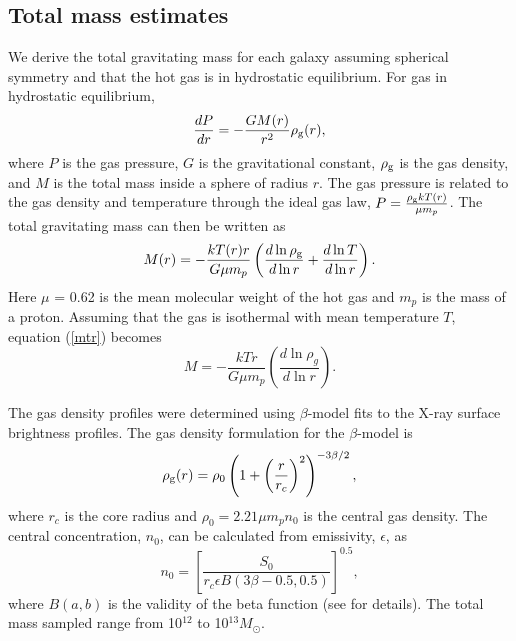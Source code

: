 \documentclass[iop]{emulateapj}
\begin{document}
\subsection{Total mass estimates}
We derive the total gravitating mass for each galaxy assuming spherical symmetry and that the hot gas is in hydrostatic equilibrium. For gas in hydrostatic equilibrium,
\begin{equation}
\frac{dP}{dr} = -\frac{G M(r)}{r^{2}} \rho_{\rm g}(r),
\label{dpdr}
\end{equation}
where $P$ is the gas pressure, $G$ is the gravitational constant, $\rho_{\rm g}$ is the gas density, and $M$ is the total mass inside a sphere of radius $r$. The gas pressure is related to the gas density and temperature through the ideal gas law, $P = \frac{\rho_{\rm g}kT(r)}{\mu m_{p}}$. The total gravitating mass can then be written as
\begin{equation}
M(r) = -\frac{kT(r)r}{G \mu m_{p}} \left( \frac{d \ln \rho_{\rm g} }{d \ln r} + \frac{d \ln T}{d \ln r}\right).
\label{mtr}
\end{equation}
Here $\mu$ = 0.62 is the mean molecular weight of the hot gas and $m_p$ is the mass of a proton. Assuming that the gas is isothermal with mean temperature $T$, equation (\ref{mtr}) becomes
\begin{equation}
M = -\frac{k T r}{G \mu m_{p}} \left( \frac{d \ln \rho_{g} }{d \ln r} \right).
\label{mtot}
\end{equation}

The gas density profiles were determined using $\beta$-model fits to the X-ray surface brightness profiles. The gas density formulation for the $\beta$-model is
\begin{equation}
\rho_{\rm g}(r) = \rho_{0} \left( 1 + \left( \frac{r}{r_{c}}\right)^{2}\right)^{-3\beta/2},
\label{rog}
\end{equation}
where $r_{c}$ is the core radius and $\rho_{0} = 2.21 \mu m_p n_0$ is the central gas density. The central concentration, $n_0$, can be calculated from emissivity, $\epsilon$, as 
\begin{equation}
 n_0 = \left[\frac{S_0}{r_c \epsilon B(3\beta-0.5, 0.5) } \right]^{0.5},
\end{equation}
where $B(a,b)$ is the validity of the beta function (see \citet{Ettori:00} for details). The total mass sampled range from 10$^{12}$ to 10$^{13} M_{\odot}$.
\end{document}

